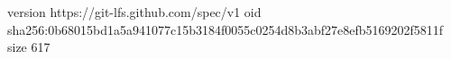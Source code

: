 version https://git-lfs.github.com/spec/v1
oid sha256:0b68015bd1a5a941077c15b3184f0055c0254d8b3abf27e8efb5169202f5811f
size 617
